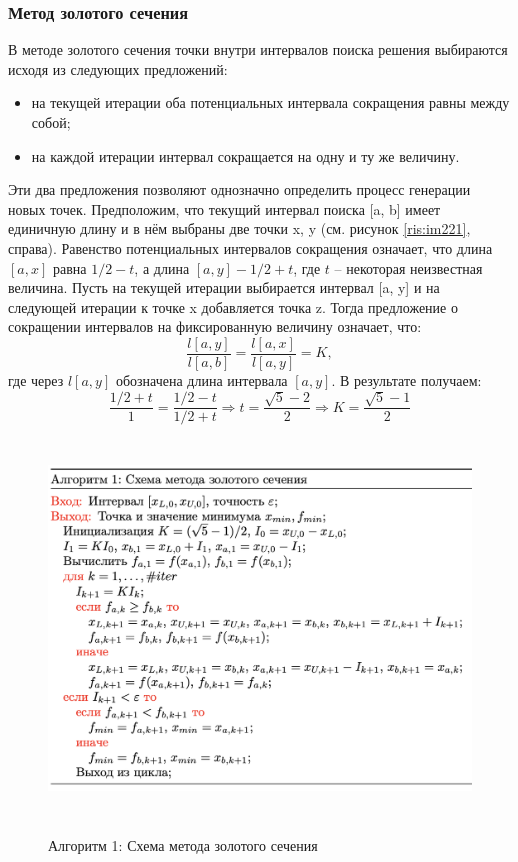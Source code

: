 \subsubsection{Метод золотого сечения}
В методе золотого сечения точки внутри интервалов поиска решения выбираются исходя из следующих предложений:
\begin{itemize}
    \item на текущей итерации оба потенциальных интервала сокращения равны между собой;
    \item на каждой итерации интервал сокращается на одну и ту же величину.
\end{itemize}
Эти два предложения позволяют однозначно определить процесс генерации новых точек. Предположим, что текущий интервал поиска [a, b] имеет единичную длину и в нём выбраны две точки x, y (см. рисунок \ref{ris:im221}, справа). Равенство потенциальных интервалов сокращения означает, что длина  $[a, x]$ равна $1/2 - t$, а длина $[a, y] - 1/2 + t$, где $t$ – некоторая неизвестная величина.
\newline \newline Пусть на текущей итерации выбирается интервал [a, y] и на следующей итерации к точке x добавляется точка z. Тогда предложение о сокращении интервалов на фиксированную величину означает, что:
$$\dfrac{l[a, y]}{l[a, b]}=\dfrac{l[a, x]}{l[a, y]}=K,$$
где через $l[a, y]$ обозначена длина интервала $[a, y]$. В результате получаем:
$$\dfrac{1/2+t}{1}=\dfrac{1/2-t}{1/2+t} \Rightarrow t = \dfrac{\sqrt{5}-2}{2} \Rightarrow K = \dfrac{\sqrt{5}-1}{2}$$
\newline
\begin{figure}[hbt!]
    \centering
    \includegraphics[width=14cm, height=10cm]{images/im222.png}
    \label{ris:im222}
    \caption{Алгоритм 1: Схема метода золотого сечения}
\end{figure}
